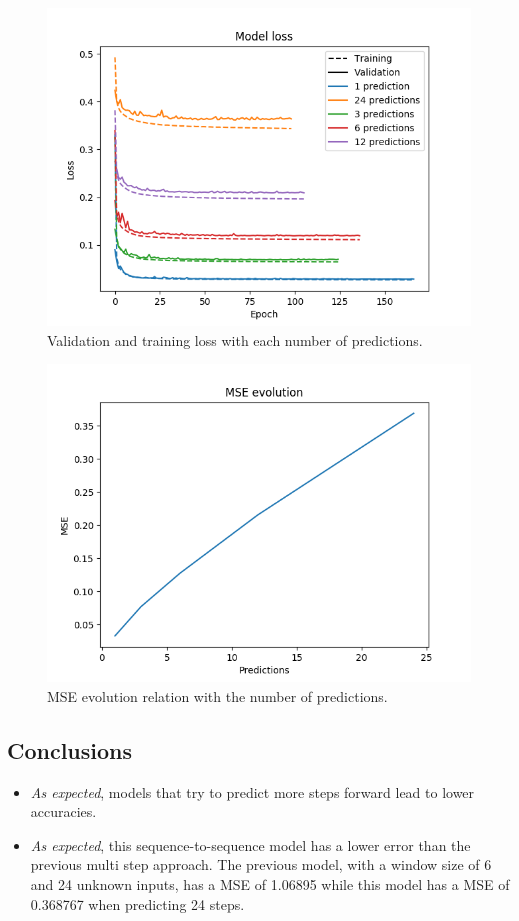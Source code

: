 \documentclass[]{article}
\begin{document}
	\begin{figure}[H]
		\centering
		\includegraphics[width=\textwidth]{seq2seq_1}
		\caption{Validation and training loss with each number of predictions.}
		\label{f:seq2seq_1}
	\end{figure}
	
	\begin{figure}[H]
		\centering
		\includegraphics[width=\textwidth]{seq2seq_2}
		\caption{MSE evolution relation with the number of predictions.}
		\label{f:seq2seq_2}
	\end{figure}
	
	\subsection{Conclusions}
	
	\begin{itemize}
		\item \emph{As expected}, models that try to predict more steps forward lead to lower accuracies.
		\item \emph{As expected}, this sequence-to-sequence model has a lower error than the previous multi step approach. The previous model, with a window size of 6 and 24 unknown inputs, has a MSE of 1.06895 while this model has a MSE of 0.368767 when predicting 24 steps.
	\end{itemize}
\end{document}
